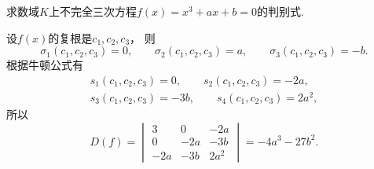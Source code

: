 \begin{example}
求数域\(K\)上不完全三次方程\(f(x)=x^3+ax+b=0\)的判别式.
\begin{solution}
设\(f(x)\)的复根是\(c_1,c_2,c_3\)，
则\begin{equation*}
	\sigma_1(c_1,c_2,c_3)=0, \qquad
	\sigma_2(c_1,c_2,c_3)=a, \qquad
	\sigma_3(c_1,c_2,c_3)=-b.
\end{equation*}
根据牛顿公式有\begin{gather*}
	s_1(c_1,c_2,c_3)=0, \qquad
	s_2(c_1,c_2,c_3)=-2a, \\
	s_3(c_1,c_2,c_3)=-3b, \qquad
	s_4(c_1,c_2,c_3)=2a^2,
\end{gather*}
所以\begin{equation*}
	D(f)
	=\begin{vmatrix}
		3 & 0 & -2a \\
		0 & -2a & -3b \\
		-2a & -3b & 2a^2
	\end{vmatrix}
	=-4a^3-27b^2.
\end{equation*}
\end{solution}
\end{example}
